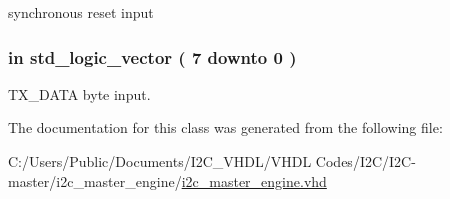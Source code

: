 synchronous reset input 

\subsubsection[{\texorpdfstring{T\+X\+\_\+\+D\+A\+TA}{TX_DATA}}]{ {\bfseries \textcolor{vhdlchar}{in}\textcolor{vhdlchar}{ }} {\bfseries \textcolor{vhdlchar}{std\+\_\+logic\+\_\+vector}\textcolor{vhdlchar}{ }\textcolor{vhdlchar}{(}\textcolor{vhdlchar}{ }\textcolor{vhdlchar}{ } \textcolor{vhdldigit}{7} \textcolor{vhdlchar}{ }\textcolor{vhdlchar}{downto}\textcolor{vhdlchar}{ }\textcolor{vhdlchar}{ } \textcolor{vhdldigit}{0} \textcolor{vhdlchar}{ }\textcolor{vhdlchar}{)}\textcolor{vhdlchar}{ }} \hspace{0.3cm}{\ttfamily [Port]}}\hypertarget{classi2c__master__engine_ac6b0a7edf9c2b243032204db9d65f177}{}\label{classi2c__master__engine_ac6b0a7edf9c2b243032204db9d65f177}


T\+X\+\_\+\+D\+A\+TA byte input. 



The documentation for this class was generated from the following file\+:\begin{DoxyCompactItemize}
\item 
C\+:/\+Users/\+Public/\+Documents/\+I2\+C\+\_\+\+V\+H\+D\+L/\+V\+H\+D\+L Codes/\+I2\+C/\+I2\+C-\/master/i2c\+\_\+master\+\_\+engine/\hyperlink{i2c__master__engine_8vhd}{i2c\+\_\+master\+\_\+engine.\+vhd}\end{DoxyCompactItemize}
